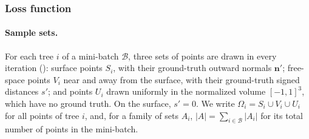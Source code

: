 \subsubsection{Loss function}            %
\label{sec:implicit_loss}                %
\label{sec:dgci_loss}                    %

\paragraph{Sample sets.}                 %
For each tree $i$ of a mini-batch $\mathcal{B}$, three sets of points are drawn in every
iteration (): surface points $S_i$, with their ground-truth
outward normals $\mathbf{n}'$; free-space points $V_i$ near and away from the surface, with
their ground-truth signed distances $s'$; and points $U_i$ drawn uniformly in the normalized
volume $[-1,1]^3$, which have no ground truth. On the surface, $s' = 0$. We write
$\Omega_i = S_i \cup V_i \cup U_i$ for all points of tree $i$, and, for a family of sets
$A_i$, $|A| = \sum_{i \in \mathcal{B}} |A_i|$ for its total number of points in the
mini-batch.

